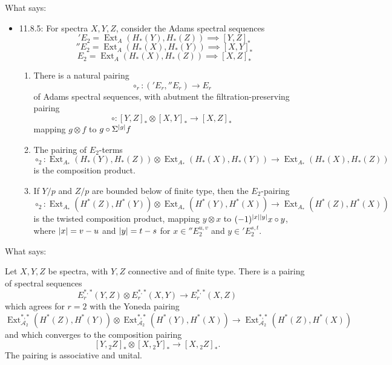 \documentclass{MetricNotes2023}
\def\A{\ensuremath{\mathscr{A}_2}}
\DeclareMathOperator{\Ext}{Ext}
\begin{document}
What \autocite{rognes2} says:
\begin{itemize}
\item 11.8.5: For spectra \(X, Y, Z\), consider the Adams spectral sequences
\['E_2 = \Ext_A(H_*(Y), H_*(Z))\implies [Y,Z]_*\]
\[''E_2 = \Ext_A(H_*(X), H_*(Y))\implies [X,Y]_*\]
\[E_2 = \Ext_A(H_*(X), H_*(Z))\implies [X,Z]_*\] \begin{enumerate}
\item There is a natural pairing 
\[\circ_r : ('E_r, ''E_r)\to E_r\]
of Adams spectral sequences, with abutment the filtration-preserving pairing
\[\circ : [Y, Z]_* \otimes [X,Y]_* \to [X,Z]_*\]
mapping \(g \otimes f\) to \(g \circ \Sigma^{\lvert g\rvert}f\)

\item The pairing of \(E_2\)-terms 
\[\circ_2 : \Ext_{A_*}(H_*(Y), H_*(Z))\otimes \Ext_{A_*}(H_*(X), H_*(Y))\to \Ext_{A_*}(H_*(X), H_*(Z))\]
is the composition product.

\item If \(Y/p\) and \(Z/p\) are bounded below of finite type, then the \(E_2\)-pairing 
\[\circ_2 : \Ext_{A_*}(H^*(Z), H^*(Y))\otimes \Ext_{A_*}(H^*(Y), H^*(X))\to \Ext_{A_*}(H^*(Z), H^*(X))\]
is the twisted composition product, mapping \(y\otimes x\) to \((-1)^{\lvert x\rvert\lvert y\rvert}x\circ y\), where \(\lvert x\rvert=v-u\) and \(\lvert y\rvert=t-s\) for \(x\in \text{}''E_2^{u,v}\) and \(y \in \text{}'E^{s,t}_2\).
\end{enumerate}
\end{itemize}

What \autocite{ass} says:

\begin{theorem}
Let \(X,Y,Z\) be spectra, with \(Y, Z\) connective and of finite type. There is a pairing of spectral sequences
\[E^{*,*}_r(Y,Z)\otimes E^{*,*}_r(X,Y)\to E^{*,*}_r(X,Z)\]
which agrees for \(r=2\) with the Yoneda pairing
\[\Ext^{*,*}_{\A}(H^*(Z), H^*(Y))\otimes \Ext_{\A}^{*,*}(H^*(Y), H^*(X))\to \Ext_{\A}^{*,*}(H^*(Z), H^*(X))\]
and which converges%
to the composition pairing
\[[Y, \text{}_2Z]_*\otimes [X,\text{}_2Y]_* \to [X, \text{}_2Z]_*.\]
The pairing is associative and unital.
\end{theorem}
\end{document}
